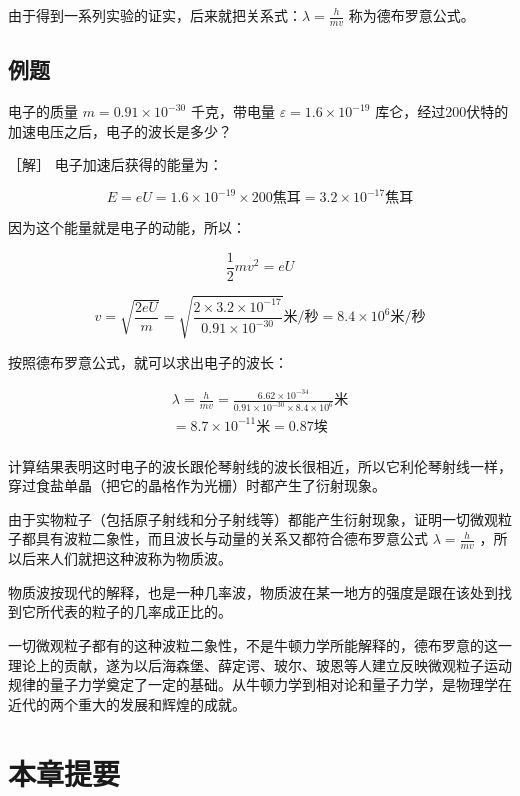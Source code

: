 由于得到一系列实验的证实，后来就把关系式：\(\lambda=\frac{h}{mv}\)
称为德布罗意公式。

\subsection{例题}

电子的质量 \(m = 0.91 \times 10^{-30}\) 千克，带电量
\(\varepsilon = 1.6 \times 10^{-19}\)
库仑，经过200伏特的加速电压之后，电子的波长是多少？

［解］ 电子加速后获得的能量为：

\[
E = e U = 1.6 \times 10 ^ {- 19} \times 200 \text{焦耳} = 3.2 \times 10 ^ {- 17} \text{焦耳}
\]

因为这个能量就是电子的动能，所以：

\[
\frac {1}{2} m v ^ {2} = e U
\]

\[
v = \sqrt {\frac {2 e U}{m}} = \sqrt {\frac {2 \times 3.2 \times 10 ^ {- 17}}{0.91 \times 10 ^ {- 30}}} \text{米/秒} = 8.4 \times 10 ^ {6} \text{米/秒}
\]

按照德布罗意公式，就可以求出电子的波长：

\[
\begin{array}{l} \lambda = \frac {h}{m v} = \frac {6.62 \times 10 ^ {- 34}}{0.91 \times 10 ^ {- 30} \times 8.4 \times 10 ^ {6}} \text{米} \\ = 8.7 \times 10 ^ {- 11} \text{米} = 0.87 \text{埃} \\ \end{array}
\]

计算结果表明这时电子的波长跟伦琴射线的波长很相近，所以它利伦琴射线一样，穿过食盐单晶（把它的晶格作为光栅）时都产生了衍射现象。

由于实物粒子（包括原子射线和分子射线等）都能产生衍射现象，证明一切微观粒子都具有波粒二象性，而且波长与动量的关系又都符合德布罗意公式
\(\lambda=\frac{h}{mv}\) ，所以后来人们就把这种波称为物质波。

物质波按现代的解释，也是一种几率波，物质波在某一地方的强度是跟在该处到找到它所代表的粒子的几率成正比的。

一切微观粒子都有的这种波粒二象性，不是牛顿力学所能解释的，德布罗意的这一理论上的贡献，遂为以后海森堡、薛定谔、玻尔、玻恩等人建立反映微观粒子运动规律的量子力学奠定了一定的基础。从牛顿力学到相对论和量子力学，是物理学在近代的两个重大的发展和辉煌的成就。

\section{本章提要}

